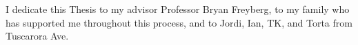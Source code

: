 I dedicate this Thesis to my advisor Professor Bryan Freyberg, to my family who has supported me throughout this process, and to Jordi, Ian, TK, and Torta from Tuscarora Ave.
